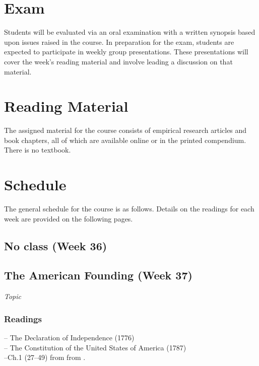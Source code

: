 \documentclass[12pt,a4paper]{article}
\newcommand{\reading}[2][]{\noindent --{#1} from \bibentry{#2}.\vspace{.25em}\\}
\begin{document}
\section{Exam}
Students will be evaluated via an oral examination with a written synopsis based upon issues raised in the course. In preparation for the exam, students are expected to participate in weekly group presentations. These presentations will cover the week's reading material and involve leading a discussion on that material.

\section{Reading Material}
The assigned material for the course consists of empirical research articles and book chapters, all of which are available online or in the printed compendium. There is no textbook.

\section{Schedule}
The general schedule for the course is as follows. Details on the readings for each week are provided on the following pages.

\secttoc


\clearpage


\subsection{No class (Week 36)}
\vspace{1em}


\clearpage
\subsection{The American Founding (Week 37)}
\emph{Topic}

\vspace{1em}
\subsubsection*{Readings}
-- The Declaration of Independence (1776)\\
-- The Constitution of the United States of America (1787)\\
\reading[Ch.1 (27--49) from ]{Maier2010} %
\end{document}
